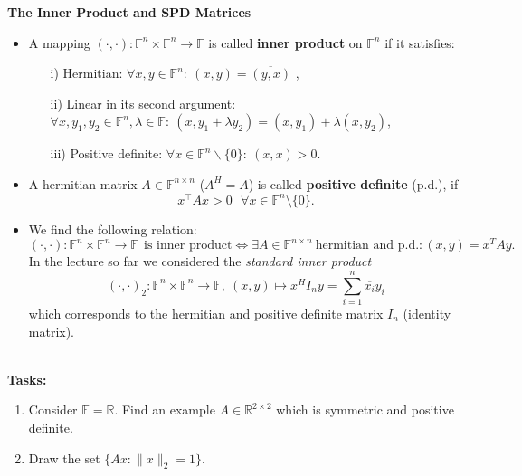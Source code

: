 \textbf{The Inner Product and SPD Matrices}
{\color{navy}\begin{itemize}
		\item  A mapping $(\cdot,\cdot)\colon \mathbb{F}^n\times \mathbb{F}^n \to \mathbb{F}$ is called \textbf{inner product} on $\mathbb{F}^n$ if it satisfies:
\begin{itemize}
	\item[i)] Hermitian: $\forall x,y \in \mathbb{F}^n: ~(x,y) = \overline{(y,x)}$ ,
	\item[ii)] Linear in its second argument: $\forall x,y_1,y_2 \in \mathbb{F}^n, \lambda \in \mathbb{F}: ~(x,y_1+\lambda y_2) = (x,y_1)+\lambda (x,y_2)$,
	\item[iii)] Positive definite: $\forall x \in \mathbb{F}^n\backslash\{0\}: ~ (x,x) > 0$.
\end{itemize}
\item A hermitian matrix $A \in \mathbb{F}^{n \times n}$ ($A^H = A$) is called \textbf{positive definite} (p.d.), if
$$x^\top Ax>0 ~~~ \forall x\in\mathbb{F}^n \setminus \{0\}.$$
\item We find the following relation:
$$(\cdot,\cdot)\colon \mathbb{F}^n\times \mathbb{F}^n \to \mathbb{F}~~ \text{is inner product} \iff \exists A \in \mathbb{F}^{n \times n} ~\text{hermitian and p.d.}\colon  (x,y) = x^T A y. $$
In the lecture so far we considered the \textit{standard inner product} $$(\cdot,\cdot)_2\colon \mathbb{F}^n\times \mathbb{F}^n \to \mathbb{F},~ (x,y) \mapsto x^HI_ny=\sum_{i=1}^n \overline{x_i} y_i$$ which corresponds to the hermitian and positive definite matrix $I_n$ (identity matrix).
	\end{itemize}
}

%





~\\
\textbf{Tasks:}
\begin{enumerate}
	\item Consider $\mathbb{F}=\mathbb{R}$. Find an example $A \in \mathbb{R}^{2 \times 2}$ which is symmetric and positive definite.
	\item Draw the set $\{ Ax\colon \|x\|_2 = 1\}$.
\end{enumerate}




